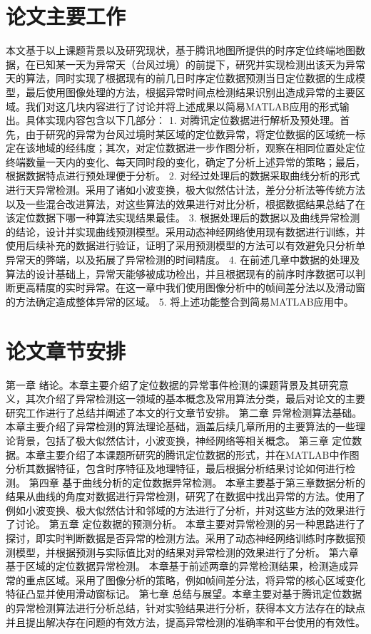 \documentclass[a4paper,AutoFakeBold,oneside,12pt]{book}
\begin{document}
\section{论文主要工作}

本文基于以上课题背景以及研究现状，基于腾讯地图所提供的时序定位终端地图数据，在已知某一天为异常天（台风过境）的前提下，研究并实现检测出该天为异常天的算法，同时实现了根据现有的前几日时序定位数据预测当日定位数据的生成模型，最后使用图像处理的方法，根据异常时间点检测结果识别出造成异常的主要区域。我们对这几块内容进行了讨论并将上述成果以简易MATLAB应用的形式输出。具体实现内容包含以下几部分：
	1.	 对腾讯定位数据进行解析及预处理。首先，由于研究的异常为台风过境时某区域的定位数异常，将定位数据的区域统一标定在该地域的经纬度；其次，对定位数据进一步作图分析，观察在相同位置处定位终端数量一天内的变化、每天同时段的变化，确定了分析上述异常的策略；最后，根据数据特点进行预处理便于分析。
	2.	 对经过处理后的数据采取曲线分析的形式进行天异常检测。采用了诸如小波变换，极大似然估计法，差分分析法等传统方法以及一些混合改进算法，对这些算法的效果进行对比分析，根据数据结果总结了在该定位数据下哪一种算法实现结果最佳。
	3.	 根据处理后的数据以及曲线异常检测的结论，设计并实现曲线预测模型。采用动态神经网络使用现有数据进行训练，并使用后续补充的数据进行验证，证明了采用预测模型的方法可以有效避免只分析单异常天的弊端，以及拓展了异常检测的时间精度。
	4.	 在前述几章中数据的处理及算法的设计基础上，异常天能够被成功检出，并且根据现有的前序时序数据可以判断更高精度的实时异常。在这一章中我们使用图像分析中的帧间差分法以及滑动窗的方法确定造成整体异常的区域。
	5.	 将上述功能整合到简易MATLAB应用中。

\section{论文章节安排}

	第一章 绪论。本章主要介绍了定位数据的异常事件检测的课题背景及其研究意义，其次介绍了异常检测这一领域的基本概念及常用算法分类，最后对论文的主要研究工作进行了总结并阐述了本文的行文章节安排。
	第二章 异常检测算法基础。本章主要介绍了异常检测的算法理论基础，涵盖后续几章所用的主要算法的一些理论背景，包括了极大似然估计，小波变换，神经网络等相关概念。
	第三章 定位数据。本章主要介绍了本课题所研究的腾讯定位数据的形式，并在MATLAB中作图分析其数据特征，包含时序特征及地理特征，最后根据分析结果讨论如何进行检测。
	第四章 基于曲线分析的定位数据异常检测。 本章主要基于第三章数据分析的结果从曲线的角度对数据进行异常检测，研究了在数据中找出异常的方法。使用了例如小波变换、极大似然估计和邻域的方法进行了分析，并对这些方法的效果进行了讨论。
	第五章 定位数据的预测分析。 本章主要对异常检测的另一种思路进行了探讨，即实时判断数据是否异常的检测方法。采用了动态神经网络训练时序数据预测模型，并根据预测与实际值比对的结果对异常检测的效果进行了分析。
	第六章 基于区域的定位数据异常检测。 本章基于前述两章的异常检测结果，检测造成异常的重点区域。采用了图像分析的策略，例如帧间差分法，将异常的核心区域变化特征凸显并使用滑动窗标记。
	第七章 总结与展望。本章主要对基于腾讯定位数据的异常检测算法进行分析总结，针对实验结果进行分析，获得本文方法存在的缺点并且提出解决存在问题的有效方法，提高异常检测的准确率和平台使用的有效性。
\end{document}
